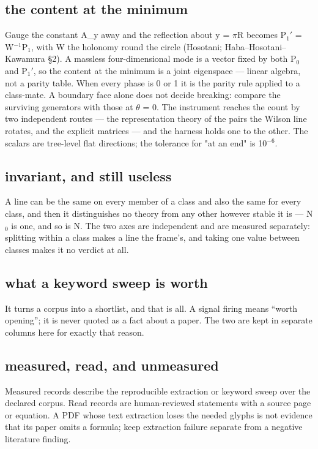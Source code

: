 \documentclass[11pt,a4paper]{article}
\begin{document}
\subsection*{the content at the minimum}
Gauge the constant A\_y away and the reflection about y = \ensuremath{\pi}R becomes P\ensuremath{{}_{1}}\ensuremath{\prime} = W\ensuremath{{}^{-1}}P\ensuremath{{}_{1}}, with W the holonomy round the circle (Hosotani; Haba--Hosotani--Kawamura §2). A massless four-dimensional mode is a vector fixed by both P\ensuremath{{}_{0}} and P\ensuremath{{}_{1}}\ensuremath{\prime}, so the content at the minimum is a joint eigenspace --- linear algebra, not a parity table. When every phase is 0 or 1 it is the parity rule applied to a class-mate. A boundary face alone does not decide breaking: compare the surviving generators with those at \ensuremath{\theta} = 0. The instrument reaches the count by two independent routes --- the representation theory of the pairs the Wilson line rotates, and the explicit matrices --- and the harness holds one to the other. The scalars are tree-level flat directions; the tolerance for "at an end" is 10\ensuremath{{}^{-6}}.

\subsection*{invariant, and still useless}
A line can be the same on every member of a class and also the same for every class, and then it distinguishes no theory from any other however stable it is --- N\ensuremath{{}_{0}} is one, and so is N. The two axes are independent and are measured separately: splitting within a class makes a line the frame's, and taking one value between classes makes it no verdict at all.

\subsection*{what a keyword sweep is worth}
It turns a corpus into a shortlist, and that is all. A signal firing means ``worth opening''; it is never quoted as a fact about a paper. The two are kept in separate columns here for exactly that reason.

\subsection*{measured, read, and unmeasured}
Measured records describe the reproducible extraction or keyword sweep over the declared corpus. Read records are human-reviewed statements with a source page or equation. A PDF whose text extraction loses the needed glyphs is not evidence that its paper omits a formula; keep extraction failure separate from a negative literature finding.
\end{document}
